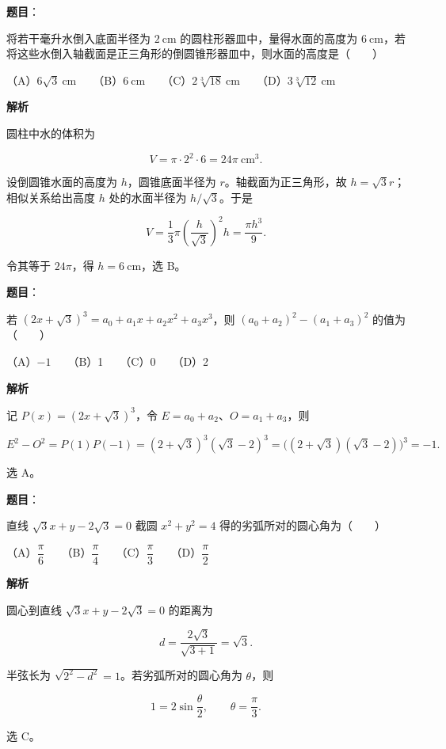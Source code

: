 \begin{answer}

\textbf{题目}：

将若干毫升水倒入底面半径为 $2\ \mathrm{cm}$ 的圆柱形器皿中，量得水面的高度为 $6\ \mathrm{cm}$，若将这些水倒入轴截面是正三角形的倒圆锥形器皿中，则水面的高度是\mbox{（　　）}

（A）$6\sqrt3\ \mathrm{cm}$　　（B）$6\ \mathrm{cm}$　　（C）$2\sqrt[3]{18}\ \mathrm{cm}$　　（D）$3\sqrt[3]{12}\ \mathrm{cm}$

\textbf{解析}

圆柱中水的体积为

\nopagebreak[4]
\[
V=\pi\cdot2^2\cdot6=24\pi\ \mathrm{cm^3}.
\]

设倒圆锥水面的高度为 $h$，圆锥底面半径为 $r$。轴截面为正三角形，故 $h=\sqrt3r$；相似关系给出高度 $h$ 处的水面半径为 $h/\sqrt3$。于是

\nopagebreak[4]
\[
V=\frac13\pi\left(\frac h{\sqrt3}\right)^2h
=\frac{\pi h^3}{9}.
\]

令其等于 $24\pi$，得 $h=6\ \mathrm{cm}$，选 B。


\end{answer}
\begin{answer}

\textbf{题目}：

若 $(2x+\sqrt3)^3=a_0+a_1x+a_2x^2+a_3x^3$，则 $(a_0+a_2)^2-(a_1+a_3)^2$ 的值为\mbox{（　　）}

（A）$-1$　　（B）1　　（C）0　　（D）2

\textbf{解析}

记 $P(x)=(2x+\sqrt3)^3$，令 $E=a_0+a_2$、$O=a_1+a_3$，则

\nopagebreak[4]
\[
E^2-O^2=P(1)P(-1)
=(2+\sqrt3)^3(\sqrt3-2)^3
=\bigl((2+\sqrt3)(\sqrt3-2)\bigr)^3=-1.
\]

选 A。


\end{answer}
\begin{answer}

\textbf{题目}：

直线 $\sqrt3x+y-2\sqrt3=0$ 截圆 $x^2+y^2=4$ 得的劣弧所对的圆心角为\mbox{（　　）}

（A）$\dfrac\pi6$　　（B）$\dfrac\pi4$　　（C）$\dfrac\pi3$　　（D）$\dfrac\pi2$

\textbf{解析}

圆心到直线 $\sqrt3x+y-2\sqrt3=0$ 的距离为

\nopagebreak[4]
\[
d=\frac{2\sqrt3}{\sqrt{3+1}}=\sqrt3.
\]

半弦长为 $\sqrt{2^2-d^2}=1$。若劣弧所对的圆心角为 $\theta$，则

\nopagebreak[4]
\[
1=2\sin\frac\theta2,
\qquad \theta=\frac\pi3.
\]

选 C。


\end{answer}
